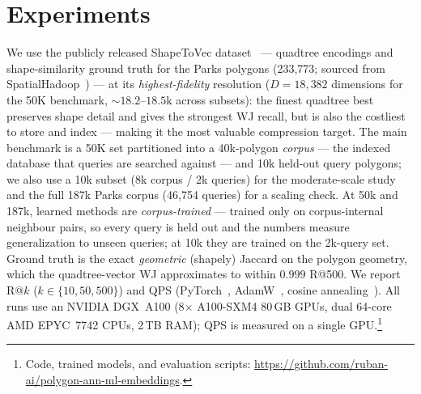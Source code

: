 \documentclass[sigconf]{acmart}
\begin{document}
\section{Experiments}
\label{sec:exp}
We use the publicly released ShapeToVec dataset~\cite{shapetovec-data} --- quadtree
encodings and shape-similarity ground truth for the Parks polygons (233{,}773;
sourced from SpatialHadoop~\cite{eldawy15}) --- at its \emph{highest-fidelity}
resolution ($D{=}18{,}382$ dimensions for the 50K benchmark, ${\sim}18.2$--$18.5$k
across subsets): the finest quadtree best preserves shape detail and gives
the strongest WJ recall, but is also the costliest to store and index --- making it
the most valuable compression target. The main benchmark is a 50K set partitioned into a 40k-polygon \emph{corpus} --- the
indexed database that queries are searched against --- and 10k held-out query
polygons; we also use a 10k subset (8k corpus / 2k queries) for the moderate-scale
study and the full 187k Parks corpus (46{,}754 queries) for a scaling check. At 50k
and 187k, learned methods are \emph{corpus-trained} --- trained only on
corpus-internal neighbour pairs, so every query is held out and the numbers measure
generalization to unseen queries; at 10k they are trained on the 2k-query set. Ground
truth is the exact \emph{geometric} (shapely) Jaccard on the polygon geometry, which
the quadtree-vector WJ approximates to within $0.999$ R@500. We report R@$k$ ($k\in\{10,50,500\}$) and QPS (PyTorch~\cite{paszke19},
AdamW~\cite{loshchilov19}, cosine annealing~\cite{loshchilov17}). All runs use an
NVIDIA DGX~A100 (8$\times$ A100-SXM4 80\,GB GPUs, dual 64-core AMD EPYC~7742 CPUs,
2\,TB RAM); QPS is measured on a single GPU.\footnote{Code, trained models, and
evaluation scripts: \url{https://github.com/ruban-ai/polygon-ann-ml-embeddings}.}
\end{document}
